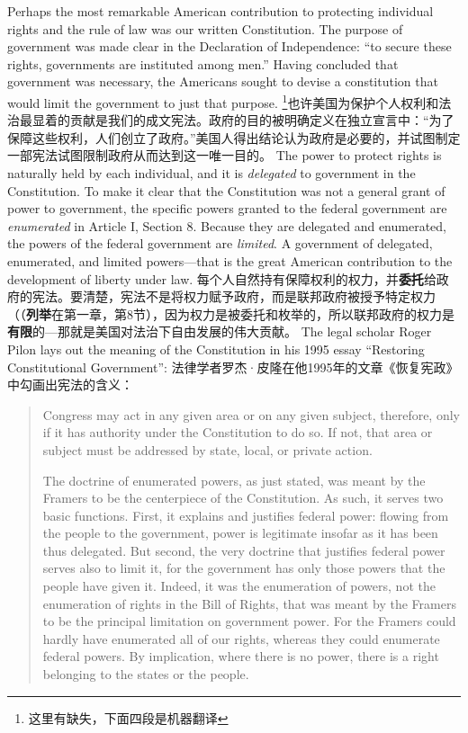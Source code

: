 \begin{paracol}{2}

Perhaps the most remarkable American contribution to protecting individual rights and the rule of law was our written Constitution. The purpose of government was made clear in the Declaration of Independence: ``to secure these rights, governments are instituted among men.'' Having concluded that government was necessary, the Americans sought to devise a constitution that would limit the government to just that
purpose.
\switchcolumn
\footnote{这里有缺失，下面四段是机器翻译}也许美国为保护个人权利和法治最显着的贡献是我们的成文宪法。政府的目的被明确定义在独立宣言中：“为了保障这些权利，人们创立了政府。”美国人得出结论认为政府是必要的，并试图制定一部宪法试图限制政府从而达到这一唯一目的。
\switchcolumn*
The power to protect rights is naturally held by each individual, and it is \textit{delegated} to government in the Constitution. To make it clear that the Constitution was not a general grant of power to government, the specific powers granted to the federal government are \textit{enumerated} in Article I, Section 8. Because they are delegated and enumerated, the powers of the federal government are \textit{limited}. A government of delegated, enumerated, and limited powers---that is the great American contribution to the development of liberty under law.
\switchcolumn
每个人自然持有保障权利的权力，并\textbf{委托}给政府的宪法。要清楚，宪法不是将权力赋予政府，而是联邦政府被授予特定权力（（\textbf{列举}在第一章，第8节），因为权力是被委托和枚举的，所以联邦政府的权力是\textbf{有限}的---那就是美国对法治下自由发展的伟大贡献。
\switchcolumn*
The legal scholar Roger Pilon lays out the meaning of the Constitution in his 1995 essay ``Restoring Constitutional Government'':
\switchcolumn
法律学者罗杰·皮隆在他1995年的文章《恢复宪政》中勾画出宪法的含义：
\switchcolumn*
\begin{quotation}
Congress may act in any given area or on any given subject,
therefore, only if it has authority under the Constitution to do so.
If not, that area or subject must be addressed by state, local, or
private action.

The doctrine of enumerated powers, as just stated, was meant by the Framers to be the centerpiece of the Constitution. As such, it serves two basic functions. First, it explains and justifies federal power: flowing from the people to the government, power is legitimate insofar as it has been thus delegated. But second, the very doctrine that justifies federal power serves also to limit it, for the government has only those powers that the people have given it. Indeed, it was the enumeration of powers, not the enumeration of rights in the Bill of Rights, that was meant by the Framers to be the principal limitation on government power. For the Framers could hardly have enumerated all of our rights, whereas they could enumerate federal powers. By implication, where there is no power, there is a right belonging to the states or the people.
\end{quotation}


\end{paracol}
